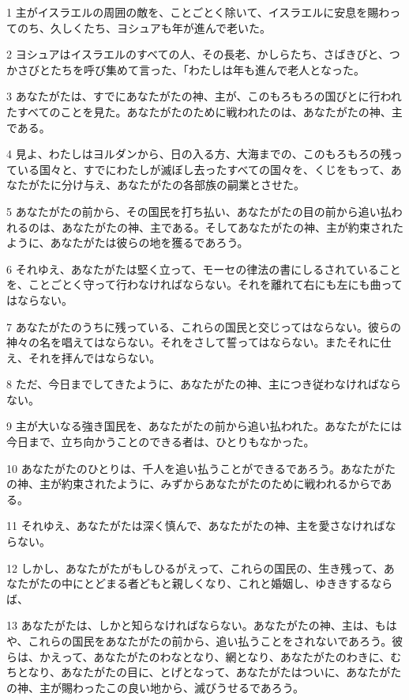 \par 1 主がイスラエルの周囲の敵を、ことごとく除いて、イスラエルに安息を賜わってのち、久しくたち、ヨシュアも年が進んで老いた。
\par 2 ヨシュアはイスラエルのすべての人、その長老、かしらたち、さばきびと、つかさびとたちを呼び集めて言った、「わたしは年も進んで老人となった。
\par 3 あなたがたは、すでにあなたがたの神、主が、このもろもろの国びとに行われたすべてのことを見た。あなたがたのために戦われたのは、あなたがたの神、主である。
\par 4 見よ、わたしはヨルダンから、日の入る方、大海までの、このもろもろの残っている国々と、すでにわたしが滅ぼし去ったすべての国々を、くじをもって、あなたがたに分け与え、あなたがたの各部族の嗣業とさせた。
\par 5 あなたがたの前から、その国民を打ち払い、あなたがたの目の前から追い払われるのは、あなたがたの神、主である。そしてあなたがたの神、主が約束されたように、あなたがたは彼らの地を獲るであろう。
\par 6 それゆえ、あなたがたは堅く立って、モーセの律法の書にしるされていることを、ことごとく守って行わなければならない。それを離れて右にも左にも曲ってはならない。
\par 7 あなたがたのうちに残っている、これらの国民と交じってはならない。彼らの神々の名を唱えてはならない。それをさして誓ってはならない。またそれに仕え、それを拝んではならない。
\par 8 ただ、今日までしてきたように、あなたがたの神、主につき従わなければならない。
\par 9 主が大いなる強き国民を、あなたがたの前から追い払われた。あなたがたには今日まで、立ち向かうことのできる者は、ひとりもなかった。
\par 10 あなたがたのひとりは、千人を追い払うことができるであろう。あなたがたの神、主が約束されたように、みずからあなたがたのために戦われるからである。
\par 11 それゆえ、あなたがたは深く慎んで、あなたがたの神、主を愛さなければならない。
\par 12 しかし、あなたがたがもしひるがえって、これらの国民の、生き残って、あなたがたの中にとどまる者どもと親しくなり、これと婚姻し、ゆききするならば、
\par 13 あなたがたは、しかと知らなければならない。あなたがたの神、主は、もはや、これらの国民をあなたがたの前から、追い払うことをされないであろう。彼らは、かえって、あなたがたのわなとなり、網となり、あなたがたのわきに、むちとなり、あなたがたの目に、とげとなって、あなたがたはついに、あなたがたの神、主が賜わったこの良い地から、滅びうせるであろう。
